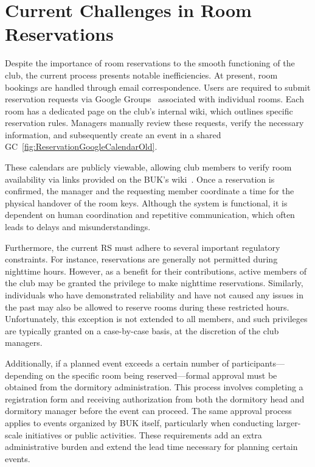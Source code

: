 \newpage

\section{Current Challenges in Room Reservations}

Despite the importance of room reservations to the smooth functioning of the club, the current process presents notable inefficiencies. At present, room bookings are handled through email correspondence. Users are required to submit reservation requests via Google Groups~\cite{googleGroups} associated with individual rooms. Each room has a dedicated page on the club’s internal wiki, which outlines specific reservation rules. Managers manually review these requests, verify the necessary information, and subsequently create an event in a shared GC~\ref{fig:ReservationGoogleCalendarOld}.

These calendars are publicly viewable, allowing club members to verify room availability via links provided on the BUK's wiki~\cite{BUKWiki}. Once a reservation is confirmed, the manager and the requesting member coordinate a time for the physical handover of the room keys. Although the system is functional, it is dependent on human coordination and repetitive communication, which often leads to delays and misunderstandings.

Furthermore, the current RS must adhere to several important regulatory constraints. For instance, reservations are generally not permitted during nighttime hours. However, as a benefit for their contributions, active members of the club may be granted the privilege to make nighttime reservations. Similarly, individuals who have demonstrated reliability and have not caused any issues in the past may also be allowed to reserve rooms during these restricted hours. Unfortunately, this exception is not extended to all members, and such privileges are typically granted on a case-by-case basis, at the discretion of the club managers.

Additionally, if a planned event exceeds a certain number of participants—depending on the specific room being reserved—formal approval must be obtained from the dormitory administration. This process involves completing a registration form and receiving authorization from both the dormitory head and dormitory manager before the event can proceed. The same approval process applies to events organized by BUK itself, particularly when conducting larger-scale initiatives or public activities. These requirements add an extra administrative burden and extend the lead time necessary for planning certain events.

